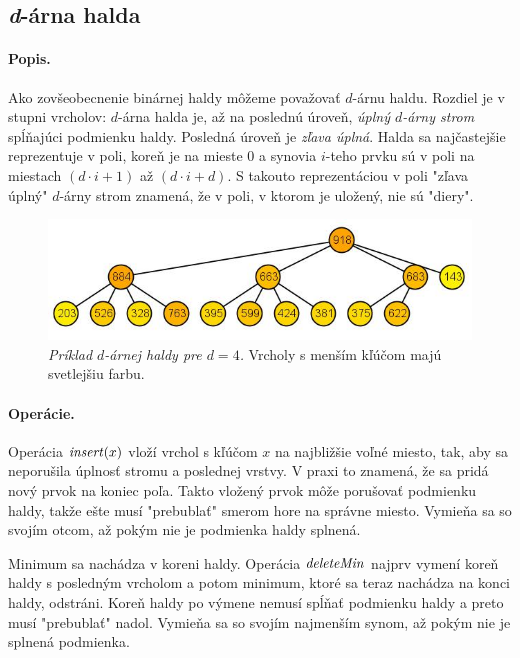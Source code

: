 
\def\find{\mathop{\mathit{find}}}
\def\delete{\mathop{\mathit{delete}}}

\subsection{\emph{d}-árna halda} 
\paragraph{Popis.}
Ako zovšeobecnenie binárnej haldy môžeme považovať $d$-árnu haldu. Rozdiel je v stupni vrcholov:
$d$-árna halda je, až na poslednú úroveň, \emph{úplný $d$-árny strom} spĺňajúci podmienku haldy. Posledná úroveň je 
\emph{zľava úplná}.
Halda sa najčastejšie reprezentuje v poli, koreň je na mieste $0$ a synovia $i$-teho prvku sú v poli na miestach 
$(d\cdot i + 1)$ až $(d\cdot i + d)$.
S takouto reprezentáciou v poli "zľava úplný" $d$-árny strom znamená, že v poli, v ktorom je uložený, nie sú "diery". 

\begin{figure}
\includegraphics[width=\columnwidth]{obrazky/daryheap.png}
\caption{\emph{Príklad $d$-árnej haldy pre $d = 4$.} Vrcholy s menším kľúčom majú svetlejšiu farbu.} 

\label{img:komp} 
\end{figure}

\paragraph{Operácie.}
Operácia $\mathop{\mathit{insert}}(x)$ vloží vrchol s kľúčom $x$ na najbližšie voľné miesto, tak, aby sa neporušila úplnosť stromu 
a poslednej vrstvy. V praxi to znamená, že sa pridá nový prvok na koniec poľa. Takto vložený prvok môže porušovať 
podmienku haldy, takže ešte musí "prebublať" smerom hore na správne miesto. Vymieňa sa so svojím otcom, až pokým 
nie je podmienka haldy splnená.

Minimum sa nachádza v koreni haldy. Operácia $\mathop{\mathit{deleteMin}}$ najprv vymení koreň haldy s posledným vrcholom a potom 
minimum, ktoré sa teraz nachádza na konci haldy, odstráni. Koreň haldy po výmene nemusí spĺňať podmienku haldy a 
preto musí "prebublať" nadol. Vymieňa sa so svojím najmenším synom, až pokým nie je splnená podmienka.

